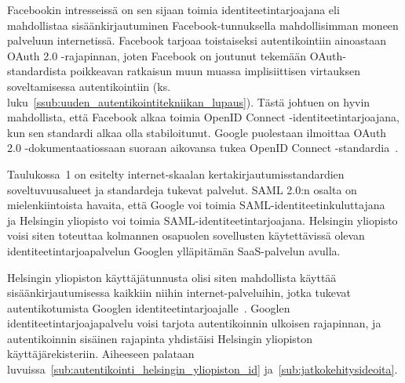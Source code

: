 \documentclass[finnish,gradu]{tktltiki}
\begin{document}
  Facebookin intresseissä on sen sijaan toimia identiteetintarjoajana eli mahdollistaa sisäänkirjautuminen Facebook-tunnuksella mahdollisimman moneen palveluun internetissä. Facebook tarjoaa toistaiseksi autentikointiin ainoastaan OAuth 2.0 \mbox{-rajapinnan}, joten Facebook on joutunut tekemään OAuth-standardista poikkeavan ratkaisun muun muassa implisiittisen virtauksen soveltamisessa autentikointiin (ks. luku~\ref{ssub:uuden_autentikointitekniikan_lupaus}). Tästä johtuen on hyvin mahdollista, että Facebook alkaa toimia OpenID Connect -identiteetintarjoajana, kun sen standardi alkaa olla stabiloitunut. Google puolestaan ilmoittaa OAuth 2.0 -dokumentaatiossaan suoraan aikovansa tukea OpenID Connect -standardia~\cite{google_oauth2_doc}.

  Taulukossa~1 on esitelty internet-skaalan kertakirjautumisstandardien soveltuvuusalueet ja standardeja tukevat palvelut. SAML 2.0:n osalta on mielenkiintoista havaita, että Google voi toimia SAML-identiteetinkuluttajana~\cite{google_saml_doc} ja Helsingin yliopisto voi toimia SAML-identiteetintarjoajana. Helsingin yliopisto voisi siten toteuttaa kolmannen osapuolen sovellusten käytettävissä olevan identiteetintarjoapalvelun Googlen ylläpitämän SaaS-palvelun avulla.

  Helsingin yliopiston käyttäjätunnusta olisi siten mahdollista käyttää sisäänkirjautumisessa kaikkiin niihin internet-palveluihin, jotka tukevat autentikotumista Googlen identiteetintarjoajalle~\cite{google_shibboleth_doc}. Googlen identiteetintarjoajapalvelu voisi tarjota autentikoinnin ulkoisen rajapinnan, ja autentikoinnin sisäinen rajapinta yhdistäisi Helsingin yliopiston käyttäjärekisteriin. Aiheeseen palataan luvuissa~\ref{sub:autentikointi_helsingin_yliopiston_id} ja~\ref{sub:jatkokehitysideoita}.
\end{document}
